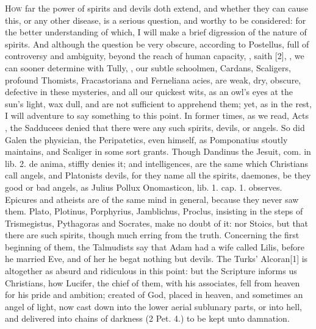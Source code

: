 {{\lettrine{H}{ow} far the power of spirits and devils doth extend, and whether they
can cause this, or any other disease, is a serious question, and worthy
to be considered: for the better understanding of which, I will make a
brief digression of the nature of spirits. And although the question be
very obscure, according to Postellus, full of controversy and
ambiguity, beyond the reach of human capacity, , saith \Austin{}[2\baselineskip], , we can sooner
determine with Tully, ,
our subtle schoolmen, Cardans, Scaligers, profound Thomists,
Fracastoriana and Ferneliana acies, are weak, dry, obscure, defective
in these mysteries, and all our quickest wits, as an owl's eyes at the
sun's light, wax dull, and are not sufficient to apprehend them; yet,
as in the rest, I will adventure to say something to this point. In
former times, as we read, Acts , the Sadducees denied that there
were any such spirits, devils, or angels. So did Galen the physician,
the Peripatetics, even \Aristotle himself, as Pomponatius stoutly
maintains, and Scaliger in some sort grants. Though Dandinus the
Jesuit, com. in lib. 2. de anima, stiffly denies it;  and intelligences, are the same which Christians call angels,
and Platonists devils, for they name all the spirits, daemones, be they
good or bad angels, as \textlatin{Julius Pollux Onomasticon}, lib. 1. cap. 1.
observes. Epicures and atheists are of the same mind in general,
because they never saw them. Plato, Plotinus, Porphyrius, Jamblichus,
Proclus, insisting in the steps of \textlatin{Trismegistus}, Pythagoras and
Socrates, make no doubt of it: nor Stoics, but that there are such
spirits, though much erring from the truth. Concerning the first
beginning of them, the Talmudists say that Adam had a wife called
Lilis, before he married Eve, and of her he begat nothing but devils.
The Turks' Alcoran[1\baselineskip] is altogether as absurd and ridiculous in this
point: but the Scripture informs us Christians, how Lucifer, the chief
of them, with his associates, fell from heaven for his pride and
ambition; created of God, placed in heaven, and sometimes an angel of
light, now cast down into the lower aerial sublunary parts, or into
hell, and delivered into chains of darkness (2 Pet.  4.) to be kept
unto damnation.

}}
